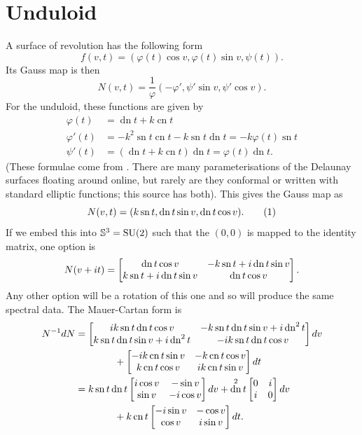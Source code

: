 \documentclass[a4paper,11pt]{article}
\DeclareMathOperator{\sn}{sn}
\DeclareMathOperator{\cn}{cn}
\DeclareMathOperator{\dn}{dn}
\begin{document}
\section*{Unduloid}
A surface of revolution has the following form
\[
f(v,t) = (φ(t) \cos v, φ(t) \sin v, ψ(t)).
\]
Its Gauss map is then
\[
N(v,t) = \frac{1}{φ} (-φ', ψ' \sin v, ψ' \cos v).
\]
For the unduloid, these functions are given by
\begin{align*}
φ(t) &= \dn t + k \cn t \\
φ'(t) &= -k^2\sn t\cn t - k \sn t \dn t = -k φ(t) \sn t \\
ψ'(t) &= (\dn t + k \cn t) \dn t = φ(t) \dn t.
\end{align*}
(These formulae come from \cite{Mladenov2014}. There are many parameterisations of the Delaunay surfaces floating around online, but rarely are they conformal or written with standard elliptic functions; this source has both).
This gives the Gauss map as
\[
N(v,t) = (k \sn t, \dn t \sin v, \dn t \cos v).
\labelthis{eqn:unduloid}
\]
If we embed this into $\S^3 = \SU(2)$ such that the $(0,0)$ is mapped to the identity matrix, one option is
\[
N(v + \iu t)
= \begin{bmatrix}
\dn t \cos v & -k \sn t + \iu \dn t \sin v \\
k \sn t + \iu \dn t \sin v & \dn t \cos v
\end{bmatrix}.
\]
Any other option will be a rotation of this one and so will produce the same spectral data. The Mauer-Cartan form is 
\begin{align*}
N^{-1}dN
&= \begin{bmatrix}
\iu k \sn t \dn t \cos v & -k \sn t \dn t \sin v + \iu \dn^2 t \\
k \sn t \dn t \sin v + \iu \dn^2 t & -\iu k \sn t \dn t \cos v
\end{bmatrix} dv \\
&\qquad\qquad + \begin{bmatrix}
-\iu k \cn t \sin v & -k \cn t \cos v \\
k \cn t \cos v & \iu k \cn t \sin v
\end{bmatrix} dt
\\
&= k \sn t \dn t \begin{bmatrix}
\iu \cos v & -\sin v \\
\sin v & -\iu \cos v
\end{bmatrix} dv
+ \dn^2 t \begin{bmatrix}
0 & \iu \\
\iu & 0
\end{bmatrix} dv \\
&\qquad\qquad + k \cn t \begin{bmatrix}
-\iu \sin v & -\cos v \\
\cos v & \iu \sin v
\end{bmatrix} dt.
\end{align*}
\end{document}

